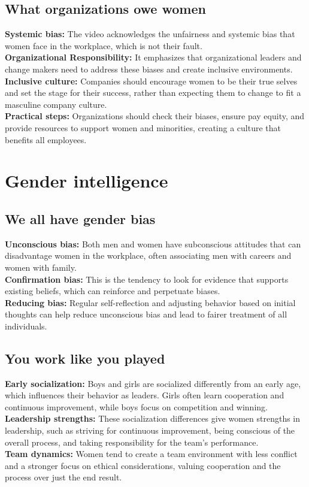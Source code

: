 \documentclass[12pt]{article}
\begin{document}
\subsection{What organizations owe women}
\textbf{Systemic bias:} The video acknowledges the unfairness and systemic bias that women face in the workplace, which is not their fault.\\
\textbf{Organizational Responsibility:} It emphasizes that organizational leaders and change makers need to address these biases and create inclusive environments.\\
\textbf{Inclusive culture:} Companies should encourage women to be their true selves and set the stage for their success, rather than expecting them to change to fit a masculine company culture.\\
\textbf{Practical steps:} Organizations should check their biases, ensure pay equity, and provide resources to support women and minorities, creating a culture that benefits all employees.\\

\newpage
\section{Gender intelligence}

\subsection{We all have gender bias }
\textbf{Unconscious bias:}  Both men and women have subconscious attitudes that can disadvantage women in the workplace, often associating men with careers and women with family.\\
\textbf{Confirmation bias:}  This is the tendency to look for evidence that supports existing beliefs, which can reinforce and perpetuate biases.\\
\textbf{Reducing bias:}  Regular self-reflection and adjusting behavior based on initial thoughts can help reduce unconscious bias and lead to fairer treatment of all individuals.

\subsection{You work like you played}
\textbf{Early socialization:}  Boys and girls are socialized differently from an early age, which influences their behavior as leaders. Girls often learn cooperation and continuous improvement, while boys focus on competition and winning.\\
\textbf{Leadership strengths:}  These socialization differences give women strengths in leadership, such as striving for continuous improvement, being conscious of the overall process, and taking responsibility for the team's performance.\\
\textbf{Team dynamics:}  Women tend to create a team environment with less conflict and a stronger focus on ethical considerations, valuing cooperation and the process over just the end result.
\end{document}
